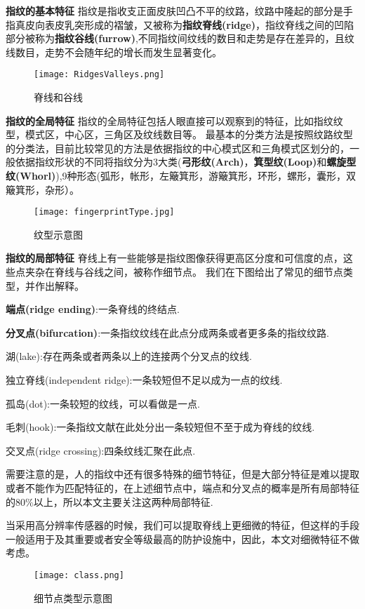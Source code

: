 \documentclass[withoutpreface,bwprint]{cumcmthesis} %
\begin{document}
\textbf{指纹的基本特征}
指纹是指收支正面皮肤凹凸不平的纹路，纹路中隆起的部分是手指真皮向表皮乳突形成的褶皱，又被称为\textbf{指纹脊线(ridge)}，指纹脊线之间的凹陷部分被称为\textbf{指纹谷线(furrow)},不同指纹间纹线的数目和走势是存在差异的，且纹线数目，走势不会随年纪的增长而发生显著变化\cite{赵应丁2006基于灰度指纹图像的指纹特征提取算法研究}。
\begin{figure}[!h]
	\centering
	\texttt{[image: RidgesValleys.png]}
	\caption{脊线和谷线}
	
\end{figure}

\textbf{指纹的全局特征}
指纹的全局特征包括人眼直接可以观察到的特征，比如指纹纹型，模式区，中心区，三角区及纹线数目等。
最基本的分类方法是按照纹路纹型的分类法，目前比较常见的方法是依据指纹的中心模式区和三角模式区划分的，一般依据指纹形状的不同将指纹分为3大类(\textbf{弓形纹(Arch)}，\textbf{箕型纹(Loop)}和\textbf{螺旋型纹(Whorl)}),9种形态(弧形，帐形，左簸箕形，游簸箕形，环形，螺形，囊形，双簸箕形，杂形）。
\begin{figure}[!h]
	\centering
	\texttt{[image: fingerprintType.jpg]}
	\caption{纹型示意图}
	
\end{figure}

\textbf{指纹的局部特征}
脊线上有一些能够是指纹图像获得更高区分度和可信度的点，这些点夹杂在脊线与谷线之间，被称作细节点。
我们在下图给出了常见的细节点类型，并作出解释。\par
\textbf{端点(ridge ending)}:一条脊线的终结点.\par
\textbf{分叉点(bifurcation)}:一条指纹纹线在此点分成两条或者更多条的指纹纹路.\par
湖(lake):存在两条或者两条以上的连接两个分叉点的纹线.\par
独立脊线(independent ridge):一条较短但不足以成为一点的纹线.\par
孤岛(dot):一条较短的纹线，可以看做是一点.\par
毛刺(hook):一条指纹文献在此处分出一条较短但不至于成为脊线的纹线.\par
交叉点(ridge crossing):四条纹线汇聚在此点.\par
需要注意的是，人的指纹中还有很多特殊的细节特征，但是大部分特征是难以提取或者不能作为匹配特征的，在上述细节点中，端点和分叉点的概率是所有局部特征的80$\%$以上，所以本文主要关注这两种局部特征.
\par

当采用高分辨率传感器的时候，我们可以提取脊线上更细微的特征，但这样的手段一般适用于及其重要或者安全等级最高的防护设施中，因此，本文对细微特征不做考虑。
\begin{figure}[!h]
	\centering
	\texttt{[image: class.png]}
	\caption{细节点类型示意图}
	
\end{figure}
\end{document}
